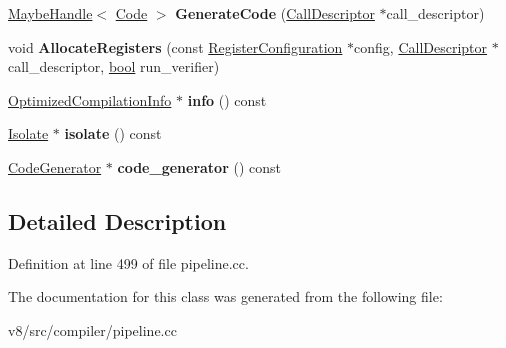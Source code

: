 \begin{DoxyCompactItemize}
\item 
\mbox{\label{classv8_1_1internal_1_1compiler_1_1PipelineImpl_ae759187f886ac53068e7d8473b73ef70}} 
\mbox{\hyperlink{classv8_1_1internal_1_1MaybeHandle}{Maybe\+Handle}}$<$ \mbox{\hyperlink{classv8_1_1internal_1_1Code}{Code}} $>$ {\bfseries Generate\+Code} (\mbox{\hyperlink{classv8_1_1internal_1_1compiler_1_1CallDescriptor}{Call\+Descriptor}} $\ast$call\+\_\+descriptor)
\item 
\mbox{\label{classv8_1_1internal_1_1compiler_1_1PipelineImpl_adb9be7db1d373d155fac2b551fe7ee86}} 
void {\bfseries Allocate\+Registers} (const \mbox{\hyperlink{classv8_1_1internal_1_1RegisterConfiguration}{Register\+Configuration}} $\ast$config, \mbox{\hyperlink{classv8_1_1internal_1_1compiler_1_1CallDescriptor}{Call\+Descriptor}} $\ast$call\+\_\+descriptor, \mbox{\hyperlink{classbool}{bool}} run\+\_\+verifier)
\item 
\mbox{\label{classv8_1_1internal_1_1compiler_1_1PipelineImpl_ae868646156a9108929fa86bcb3ffcb32}} 
\mbox{\hyperlink{classv8_1_1internal_1_1OptimizedCompilationInfo}{Optimized\+Compilation\+Info}} $\ast$ {\bfseries info} () const
\item 
\mbox{\label{classv8_1_1internal_1_1compiler_1_1PipelineImpl_a1a4f23cc874374bea011613937d020f7}} 
\mbox{\hyperlink{classv8_1_1internal_1_1Isolate}{Isolate}} $\ast$ {\bfseries isolate} () const
\item 
\mbox{\label{classv8_1_1internal_1_1compiler_1_1PipelineImpl_a98d8c36f0fcfe0215da72b19ab6c9bb9}} 
\mbox{\hyperlink{classv8_1_1internal_1_1compiler_1_1CodeGenerator}{Code\+Generator}} $\ast$ {\bfseries code\+\_\+generator} () const
\end{DoxyCompactItemize}


\subsection{Detailed Description}


Definition at line 499 of file pipeline.\+cc.



The documentation for this class was generated from the following file\+:\begin{DoxyCompactItemize}
\item 
v8/src/compiler/pipeline.\+cc\end{DoxyCompactItemize}
